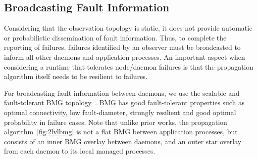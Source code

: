 \documentclass[sigconf]{acmart}
\begin{document}

\subsection{Broadcasting Fault Information}
Considering that the observation topology is static, it does not provide
automatic or probabilistic dissemination of fault information. Thus, to complete
the reporting of failures, failures identified by an observer must be broadcasted
to inform all other daemons and application processes. An important aspect
when considering a runtime that tolerates node/daemon failures is that the
propagation algorithm itself needs to be resilient to failures.

For broadcasting fault information between daemons, we use the scalable and fault-tolerant BMG topology~\cite{Angskun07}. BMG has good fault-tolerant properties such
as optimal connectivity, low fault-diameter, strongly resilient and good optimal
probability in failure cases. Note that unlike prior works, the propagation
algorithm~\ref{fig:2lvlbmg} is not a flat BMG between application processes, but consists of an
inner BMG overlay between daemons, and an outer star overlay from each daemon to its
local managed processes.
\end{document}
